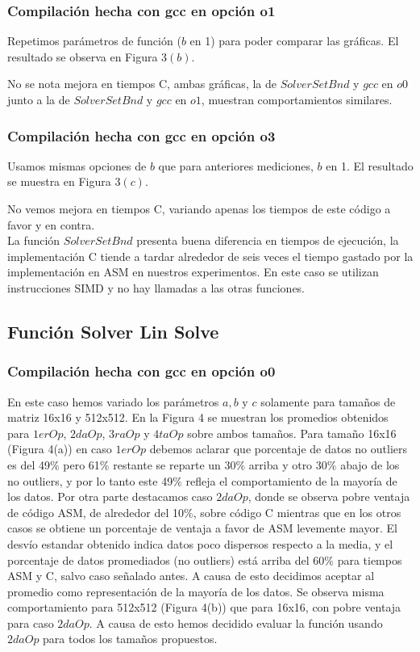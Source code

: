 \subsubsection{Compilación hecha con gcc en opción o1}
Repetimos parámetros de función ($b$ en 1) para poder comparar las gráficas. El resultado se observa en Figura 3$(b)$.
 
No se nota mejora en tiempos C, ambas gráficas, la de $Solver Set Bnd$ y $gcc$ en $o0$ junto a la de $Solver Set Bnd$ y $gcc$ en $o1$, muestran comportamientos similares.

\subsubsection{Compilación hecha con gcc en opción o3}
Usamos mismas opciones de $b$ que para anteriores mediciones, $b$ en 1. El resultado se muestra en Figura 3$(c)$.
 
No vemos mejora en tiempos C, variando apenas los tiempos de este código a favor y en contra. 
\\

La función $Solver Set Bnd$ presenta buena diferencia en tiempos de ejecución, la implementación C tiende a tardar alrededor de seis veces el tiempo gastado por la implementación en ASM en nuestros experimentos. En este caso se utilizan instrucciones SIMD y no hay llamadas a las otras funciones.

 
\subsection{Función Solver Lin Solve}

\subsubsection{Compilación hecha con gcc en opción o0}
En este caso hemos variado los parámetros $a,b$ y $c$ solamente para tamaños de matriz 16x16 y 512x512. En la Figura 4 se muestran los promedios obtenidos para $1erOp$, $2daOp$, $3raOp$ y $4taOp$ sobre ambos tamaños. 
Para tamaño 16x16 (Figura 4(a)) en caso $1erOp$ debemos aclarar que porcentaje de datos no outliers es del 49$\%$ pero 61$\%$ restante se reparte un 30$\%$ arriba y otro 30$\%$ abajo de los no outliers, y por lo tanto este 49$\%$ refleja el comportamiento de la mayoría de los datos. Por otra parte destacamos caso $2daOp$, donde se observa pobre ventaja de código ASM, de alrededor del 10$\%$, sobre código C mientras que en los otros casos se obtiene un porcentaje de ventaja a favor de ASM levemente mayor. El desvío estandar obtenido indica datos poco dispersos respecto a la media, y el porcentaje de datos promediados (no outliers) está arriba del 60$\%$ para tiempos ASM y C, salvo caso señalado antes. A causa de esto decidimos aceptar al promedio como representación de la mayoría de los datos. Se observa misma comportamiento para 512x512 (Figura 4(b)) que para 16x16, con pobre ventaja para caso $2daOp$. A causa de esto hemos decidido evaluar la función usando $2daOp$ para todos los tamaños propuestos.
 
